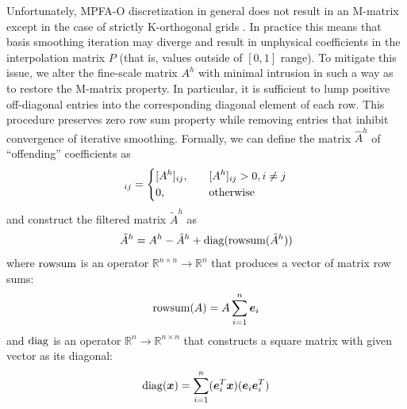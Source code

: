Unfortunately, MPFA-O discretization in general does not result in an M-matrix except in the case of strictly K-orthogonal grids \cite{Aavatsmark2002}.   In practice this means that basis smoothing iteration may diverge and result in unphysical coefficients in the interpolation matrix $P$ (that is, values outside of $[0,1]$ range).   To mitigate this issue, we alter the fine-scale matrix $A^h$ with minimal intrusion in such a way as to restore the M-matrix property.   In particular, it is sufficient to lump positive off-diagonal entries into the corresponding diagonal element of each row.   This procedure preserves zero row sum property while removing entries that inhibit convergence of iterative smoothing.   Formally, we can define the matrix $\hat{A}^h$ of ``offending'' coefficients as
\begin{align}
    [\hat{A}^h]_{ij} = 
    \begin{dcases}
        [A^h]_{ij}, \quad &[A^h]_{ij} > 0, i \neq j \\
        0, \quad &\text{otherwise}
    \end{dcases}
    \label{eq:msrsb_mpfa_filtering_offd}
\end{align}
and construct the filtered matrix $\tilde{A}^h$ as
\begin{align}
    \tilde{A}^h = A^h - \hat{A}^h + \operatorname{diag}({\operatorname{rowsum}(\hat{A}^h)})
    \label{eq:msrsb_mpfa_filtering}
\end{align}
where $\operatorname{rowsum}$ is an operator $\mathbb{R}^{n \times n} \to \mathbb{R}^n$ that produces a vector of matrix row sums:
\begin{align}
    \operatorname{rowsum}(A) = A\sum\limits_{i=1}^n \bm{e}_i
    \label{eq:rowsum_operator}
\end{align}
and $\operatorname{diag}$ is an operator $\mathbb{R}^{n} \to \mathbb{R}^{n \times n}$ that constructs a square matrix with given vector as its diagonal:
\begin{align}
    \operatorname{diag}(\bm{x}) = \sum\limits_{i=1}^n (\bm{e}_i^T \bm{x}) (\bm{e}_i \bm{e}_i^T)
    \label{eq:diag_operator}
\end{align}
